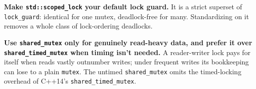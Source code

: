 \textbf{Make \texttt{std::scoped\_lock} your default lock guard.} It is a strict superset of \texttt{lock\_guard}: identical for one mutex, deadlock-free for many. Standardizing on it removes a whole class of lock-ordering deadlocks.

\textbf{Use \texttt{shared\_mutex} only for genuinely read-heavy data, and prefer it over \texttt{shared\_timed\_mutex} when timing isn't needed.} A reader-writer lock pays for itself when reads vastly outnumber writes; under frequent writes its bookkeeping can lose to a plain \texttt{mutex}. The untimed \texttt{shared\_mutex} omits the timed-locking overhead of C++14's \texttt{shared\_timed\_mutex}.
